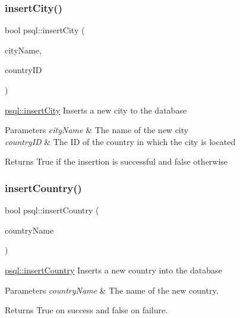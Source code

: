 \subsubsection{\texorpdfstring{insert\+City()}{insertCity()}}
{\footnotesize\ttfamily bool psql\+::insert\+City (\begin{DoxyParamCaption}\item[{Q\+String}]{city\+Name,  }\item[{int}]{country\+ID }\end{DoxyParamCaption})}



\mbox{\hyperlink{classpsql_a767b85014d9df3eac148730f18888d6d}{psql\+::insert\+City}} Inserts a new city to the database 


\begin{DoxyParams}{Parameters}
{\em city\+Name} & The name of the new city \\
\hline
{\em country\+ID} & The ID of the country in which the city is located \\
\hline
\end{DoxyParams}
\begin{DoxyReturn}{Returns}
True if the insertion is successful and false otherwise 
\end{DoxyReturn}
\mbox{\label{classpsql_ab3b5934ce3fbc4be1730d990d4142893}} 
\subsubsection{\texorpdfstring{insert\+Country()}{insertCountry()}}
{\footnotesize\ttfamily bool psql\+::insert\+Country (\begin{DoxyParamCaption}\item[{Q\+String}]{country\+Name }\end{DoxyParamCaption})}



\mbox{\hyperlink{classpsql_ab3b5934ce3fbc4be1730d990d4142893}{psql\+::insert\+Country}} Inserts a new country into the database 


\begin{DoxyParams}{Parameters}
{\em country\+Name} & The name of the new country. \\
\hline
\end{DoxyParams}
\begin{DoxyReturn}{Returns}
True on success and false on failure. 
\end{DoxyReturn}
\mbox{\label{classpsql_a601ee0bdc9430b1d674a857f7c94b767}} 

